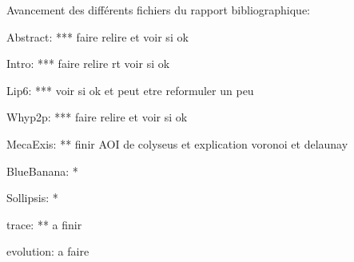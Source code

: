 Avancement des différents fichiers du rapport bibliographique:

Abstract: *** faire relire et voir si ok 

Intro: *** faire relire rt voir si ok

Lip6: *** voir si ok et peut etre reformuler un peu
 
Whyp2p: *** faire relire et voir si ok

MecaExis: ** finir AOI de colyseus et explication voronoi et delaunay

BlueBanana: *

Sollipsis: *

trace: ** a finir

evolution: a faire

